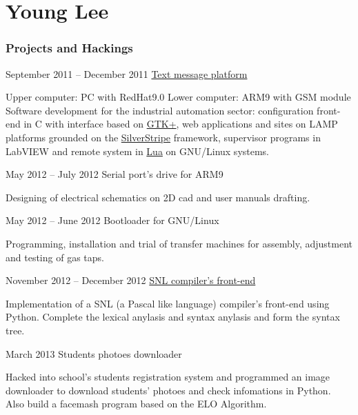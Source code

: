 \documentclass{tccv}
\begin{document}
\part{Young Lee}

\section{Projects and Hackings}

\begin{eventlist}


\item{September 2011 -- December 2011}
  {}
  {\href{https://github.com/YoungLeeNENU/MessagePlatform}{Text message platform}}
  
  Upper computer: PC with RedHat9.0
  Lower computer: ARM9 with GSM module
  Software development for the industrial automation sector: configuration
  front-end in C with interface based on \href{http://www.gtk.org/}{GTK+},
  web applications and sites on LAMP platforms grounded on the
  \href{https://github.com/YoungLeeNENU/MessagePlatform}{SilverStripe} framework,
  supervisor programs in LabVIEW and remote system in
  \href{http://www.lua.org/}{Lua} on GNU/Linux systems.

\item{May 2012 -- July 2012}
  {}
  {Serial port's drive for ARM9}

  Designing of electrical schematics on
  2D cad and user manuals drafting.

\item{May 2012 -- June 2012}
  {}
  {Bootloader for GNU/Linux}

  Programming, installation and trial of transfer machines for assembly,
  adjustment and testing of gas taps. 

\item{November 2012 -- December 2012}
  {}
  {\href{https://github.com/YoungLeeNENU/A-samll-compiler-frontend}{SNL compiler's front-end}}

  Implementation of a SNL (a Pascal like language) compiler's front-end using Python.
  Complete the lexical anylasis and syntax anylasis and form the syntax tree.

\item{March 2013}
  {}
  {Students photoes downloader}

  Hacked into school's students registration system
  and programmed an image downloader to download students' photoes and check infomations in Python. \\
  Also build a facemash program based on the ELO Algorithm.


\end{eventlist}
\end{document}
